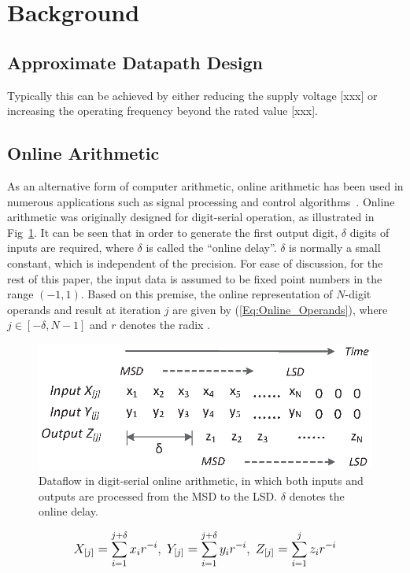 \documentclass[10pt, conference, compsocconf]{IEEEtran}
\begin{document}
\section{Background}\label{sec:Background}
\subsection{Approximate Datapath Design}
Typically this can be achieved by either reducing the supply voltage [xxx] or increasing the operating frequency beyond the rated value [xxx].

\subsection{Online Arithmetic}

As an alternative form of computer arithmetic, online arithmetic has been used in numerous applications such as signal processing and control algorithms~\cite{Online_FPGADSP,Online_Control}. Online arithmetic was originally designed for digit-serial operation, as illustrated in Fig~\ref{Fig:OnlineDataFlow}. It can be seen that in order to generate the first output digit, $\delta$ digits of inputs are required, where $\delta$ is called the ``online delay''. $\delta$ is normally a small constant, which is independent of the precision. For ease of discussion, for the rest of this paper, the input data is assumed to be fixed point numbers in the range $(-1,1)$. Based on this premise, the online representation of $N$-digit operands and result at iteration $j$ are given by (\ref{Eq:Online_Operands}), where $j\in[-\delta,N-1]$ and $r$ denotes the radix \cite{Ercegovac_Book}.
%
\begin{figure}[tbp]
  \centering
  \includegraphics[width=.42\textwidth]{./figures/OnlineArithmetic_DataFlow.eps}
  \caption{Dataflow in digit-serial online arithmetic, in which both inputs and outputs are processed from the MSD to the LSD. $\delta$ denotes the online delay.}
  \vspace{-2ex}
  \label{Fig:OnlineDataFlow}
\end{figure}
%
\begin{eqnarray}\label{Eq:Online_Operands}
\footnotesize
  X_{[j]}=\sum_{i=1}^{j+\delta}x_ir^{-i},~Y_{[j]}=\sum_{i=1}^{j+\delta}y_ir^{-i},~Z_{[j]}=\sum_{i=1}^{j}z_ir^{-i}
\normalsize
\end{eqnarray}
\end{document}
